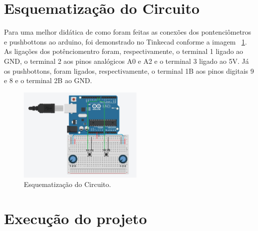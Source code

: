 \documentclass[conference]{IEEEtran}
\begin{document}
\section{Esquematização do Circuito}
Para uma melhor didática de como foram feitas as conexões dos pontenciômetros e pushbottons ao arduino, foi demonstrado no Tinkecad conforme a imagem ~\ref{fig:esquema}. As ligações dos potênciomentro foram, respectivamente, o terminal 1 ligado ao GND, o terminal 2 aos pinos analógicos A0 e A2 e o terminal 3 ligado ao 5V. Já os pushbottons, foram ligados, respectivamente, o terminal 1B aos pinos digitais 9 e 8 e o terminal 2B ao GND. 
\begin{figure}[htbp]
\centerline{
    \includegraphics[width= 6cm]{images/Tinkercad.jpeg}
    }
\caption{Esquematização do Circuito.}
\label{fig:esquema}
\end{figure}
\section{Execução do projeto}
\end{document}
